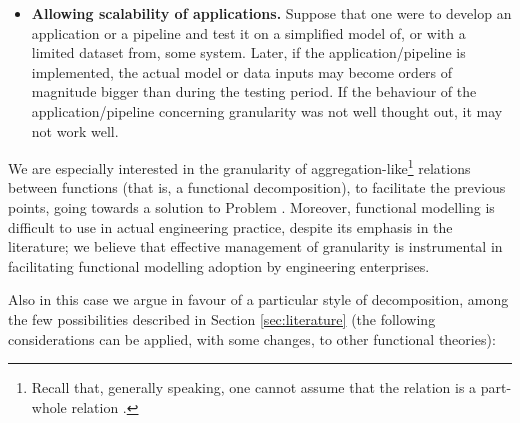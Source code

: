 \documentclass[
]{ceurart}
\begin{document}
\begin{itemize}
    \item \textbf{Allowing scalability of applications.} 
    Suppose that one were to develop an application or a pipeline and test it on a simplified model of, or with a limited dataset from, some system. Later, if the application/pipeline is implemented, the actual model or data inputs may become orders of magnitude bigger than during the testing period. If the behaviour of the application/pipeline concerning granularity was not well thought out, it may not work well.%
\end{itemize}

We are especially interested in the granularity of aggregation-like\footnote{Recall that, generally speaking, one cannot assume that the relation is a part-whole relation \cite{vermaasFormalImpossibilityAnalysing2013}.} relations between functions (that is, a functional decomposition), to facilitate the previous points, going towards a solution to Problem . Moreover, functional modelling is difficult to use in actual engineering practice, despite its emphasis in the literature; we believe that effective management of granularity is instrumental in facilitating functional modelling adoption by engineering enterprises.

Also in this case we argue in favour of a particular style of decomposition, among the few possibilities described in Section \ref{sec:literature} (the following considerations can be applied, with some changes, to other functional theories):
\end{document}
